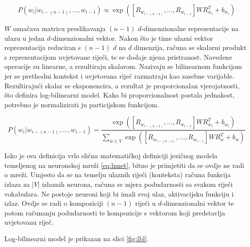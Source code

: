 \documentclass[times, utf8, diplomski, numeric]{fer}
\begin{document}
\begin{equation}
P(w_i | w_{i - (n - 1)}, ... , w_{i - 1}) 
  \propto \exp\left(\left[R_{w_{i - (n - 1)}}, ..., R_{w_{i - 1}}\right] W R_{w_i}^T + b_{w_i}\right)
\end{equation}

$W$ označava matricu preslikavanja $(n - 1)$ $d$-dimenzionalne reprezentacije na ulazu u jedan $d$-dimenzionalni vektor. Nakon što je time ulazni vektor reprezentacija reduciran s $(n - 1)$ $d$ na $d$ dimenzija, računa se skalarni produkt s reprezentacijom uvjetovane riječi, te se dodaje njena pristranost. Navedene operacije su linearne, a rezultiraju skalarom. Nazivaju se bilinearnom funkcijom jer se prethodni kontekst i uvjetovana riječ razmatraju kao zasebne varijable. Rezultirajući skalar se eksponencira, a rezultat je proporcionalan vjerojatnosti, što definira log-bilinearni model. Kako bi proporcionalnost postala jednakost, potrebno je normalizirati ju particijskom funkcijom.

\begin{equation}
P(w_i | w_{i - (n - 1)}, ... , w_{i - 1}) 
  = \frac{\exp\left(\left[R_{w_{i - (n - 1)}}, ..., R_{w_{i - 1}}\right] W R_{w_i}^T + b_{w_i}\right)}
  {\sum_{w \in V} \exp\left(\left[R_{w_{i - (n - 1)}}, ..., R_{w_{i - 1}}\right] W R_{w}^T + b_{w}\right)}
\end{equation}

Iako je ova definicija vrlo slična matematičkoj definiciji jezičnog modela temeljenog na neuronskoj mreži \ref{eq:lnnet}, bitno je primjetiti da se ovdje ne radi o mreži. Umjesto da se na temelju ulaznih riječi (konteksta) računa funkcija izlaza za $|V|$ izlaznih neurona, računa se mjera podudarnosti sa svakom riječi vokabulara. Ne postoje neuroni koji bi imali svoj ulaz, aktivacijsku funkciju i izlaz. Ovdje se radi o kompoziciji $(n - 1)$ riječi u $d$-dimenzionalni vektor te potom računanju podudarnosti te kompozicije s vektorom koji predstavlja uvjetovanu riječ.

Log-bilinearni model je prikazan na slici \ref{fig:lbl}.
\end{document}
